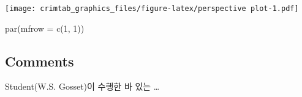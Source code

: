 \documentclass[
]{article}
\newenvironment{Shaded}{\begin{snugshade}}{\end{snugshade}}
\newcommand{\AttributeTok}[1]{\textcolor[rgb]{0.77,0.63,0.00}{#1}}
\newcommand{\DecValTok}[1]{\textcolor[rgb]{0.00,0.00,0.81}{#1}}
\newcommand{\FunctionTok}[1]{\textcolor[rgb]{0.00,0.00,0.00}{#1}}
\newcommand{\NormalTok}[1]{#1}
\begin{document}
\texttt{[image: crimtab\_graphics\_files/figure-latex/perspective plot-1.pdf]}

\begin{Shaded}
\begin{Highlighting}[]
\FunctionTok{par}\NormalTok{(}\AttributeTok{mfrow =} \FunctionTok{c}\NormalTok{(}\DecValTok{1}\NormalTok{, }\DecValTok{1}\NormalTok{))}
\end{Highlighting}
\end{Shaded}

\hypertarget{comments}{%
\subsection{Comments}\label{comments}}

Student(W.S. Gosset)이 수행한 바 있는 \ldots{}
\end{document}
